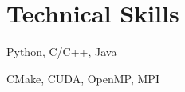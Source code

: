 \section{Technical Skills}
\resumeSubHeadingListStart

{Python, C/C++, Java }%

{CMake, CUDA, OpenMP, MPI}%


\resumeSubHeadingListEnd
